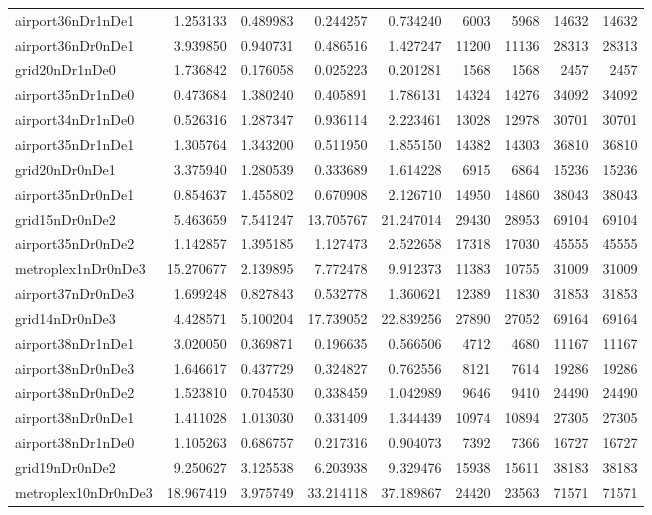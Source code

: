 \begin{longtable}{|l|r|r|r|r|r|r|r|r|}
airport36nDr1nDe1 & 1.253133 & 0.489983 & 0.244257 & 0.734240 & 6003 & 5968 & 14632 & 14632 \\
airport36nDr0nDe1 & 3.939850 & 0.940731 & 0.486516 & 1.427247 & 11200 & 11136 & 28313 & 28313 \\
grid20nDr1nDe0 & 1.736842 & 0.176058 & 0.025223 & 0.201281 & 1568 & 1568 & 2457 & 2457 \\
airport35nDr1nDe0 & 0.473684 & 1.380240 & 0.405891 & 1.786131 & 14324 & 14276 & 34092 & 34092 \\
airport34nDr1nDe0 & 0.526316 & 1.287347 & 0.936114 & 2.223461 & 13028 & 12978 & 30701 & 30701 \\
airport35nDr1nDe1 & 1.305764 & 1.343200 & 0.511950 & 1.855150 & 14382 & 14303 & 36810 & 36810 \\
grid20nDr0nDe1 & 3.375940 & 1.280539 & 0.333689 & 1.614228 & 6915 & 6864 & 15236 & 15236 \\
airport35nDr0nDe1 & 0.854637 & 1.455802 & 0.670908 & 2.126710 & 14950 & 14860 & 38043 & 38043 \\
grid15nDr0nDe2 & 5.463659 & 7.541247 & 13.705767 & 21.247014 & 29430 & 28953 & 69104 & 69104 \\
airport35nDr0nDe2 & 1.142857 & 1.395185 & 1.127473 & 2.522658 & 17318 & 17030 & 45555 & 45555 \\
metroplex1nDr0nDe3 & 15.270677 & 2.139895 & 7.772478 & 9.912373 & 11383 & 10755 & 31009 & 31009 \\
airport37nDr0nDe3 & 1.699248 & 0.827843 & 0.532778 & 1.360621 & 12389 & 11830 & 31853 & 31853 \\
grid14nDr0nDe3 & 4.428571 & 5.100204 & 17.739052 & 22.839256 & 27890 & 27052 & 69164 & 69164 \\
airport38nDr1nDe1 & 3.020050 & 0.369871 & 0.196635 & 0.566506 & 4712 & 4680 & 11167 & 11167 \\
airport38nDr0nDe3 & 1.646617 & 0.437729 & 0.324827 & 0.762556 & 8121 & 7614 & 19286 & 19286 \\
airport38nDr0nDe2 & 1.523810 & 0.704530 & 0.338459 & 1.042989 & 9646 & 9410 & 24490 & 24490 \\
airport38nDr0nDe1 & 1.411028 & 1.013030 & 0.331409 & 1.344439 & 10974 & 10894 & 27305 & 27305 \\
airport38nDr1nDe0 & 1.105263 & 0.686757 & 0.217316 & 0.904073 & 7392 & 7366 & 16727 & 16727 \\
grid19nDr0nDe2 & 9.250627 & 3.125538 & 6.203938 & 9.329476 & 15938 & 15611 & 38183 & 38183 \\
metroplex10nDr0nDe3 & 18.967419 & 3.975749 & 33.214118 & 37.189867 & 24420 & 23563 & 71571 & 71571 \\

\end{longtable}

